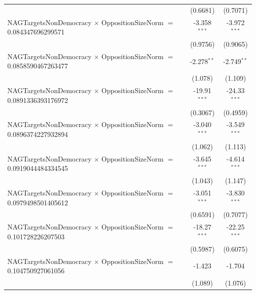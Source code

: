 \begin{tabular}{lcc}
                                                                                & (0.6681)             & (0.7071)\\   
   NAGTargetsNonDemocracy $\times$ OppositionSizeNorm $=$ 0.084347696299571     & -3.358$^{***}$       & -3.972$^{***}$\\   
                                                                                & (0.9756)             & (0.9065)\\   
   NAGTargetsNonDemocracy $\times$ OppositionSizeNorm $=$ 0.0858590467263477    & -2.278$^{**}$        & -2.749$^{**}$\\   
                                                                                & (1.078)              & (1.109)\\   
   NAGTargetsNonDemocracy $\times$ OppositionSizeNorm $=$ 0.0891336393176972    & -19.91$^{***}$       & -24.33$^{***}$\\   
                                                                                & (0.3067)             & (0.4959)\\   
   NAGTargetsNonDemocracy $\times$ OppositionSizeNorm $=$ 0.0896374227932894    & -3.040$^{***}$       & -3.549$^{***}$\\   
                                                                                & (1.062)              & (1.113)\\   
   NAGTargetsNonDemocracy $\times$ OppositionSizeNorm $=$ 0.0919044484334545    & -3.645$^{***}$       & -4.614$^{***}$\\   
                                                                                & (1.043)              & (1.147)\\   
   NAGTargetsNonDemocracy $\times$ OppositionSizeNorm $=$ 0.0979498501405612    & -3.051$^{***}$       & -3.830$^{***}$\\   
                                                                                & (0.6591)             & (0.7077)\\   
   NAGTargetsNonDemocracy $\times$ OppositionSizeNorm $=$ 0.101728226207503     & -18.27$^{***}$       & -22.25$^{***}$\\   
                                                                                & (0.5987)             & (0.6075)\\   
   NAGTargetsNonDemocracy $\times$ OppositionSizeNorm $=$ 0.104750927061056     & -1.423               & -1.704\\   
                                                                                & (1.089)              & (1.076)\\   

\end{tabular}
